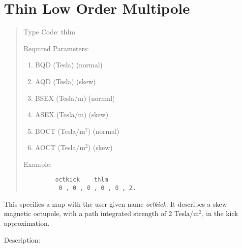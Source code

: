 
\section{Thin Low Order Multipole}
\begin{quotation}
\noindent Type Code:  thlm
\vspace{5mm}

\noindent Required Parameters:
\begin{enumerate}
      \item  BQD (Tesla) \hspace{1em} (normal)
      \item  AQD (Tesla) \hspace{1em} (skew)
      \item  BSEX (Tesla/m) \hspace{1em} (normal)
      \item  ASEX (Tesla/m) \hspace{1em} (skew)
      \item  BOCT (Tesla/$\mbox{m}^2$) \hspace{1em} (normal)
      \item  AOCT (Tesla/$\mbox{m}^2$) \hspace{1em} (skew)
\end{enumerate}

\vspace{5mm}
\noindent Example:
\begin{verbatim}
         octkick    thlm
          0 , 0 , 0 , 0 , 0 , 2.
\end{verbatim}
\end{quotation}
This specifies a map with the user given name {\em octkick}.   It describes a skew
magnetic octupole, with a path integrated strength of 2 Tesla/$\mbox{m}^2$, in the
kick approximation.

\vspace{5mm}
     Description:
\vspace{2mm}

